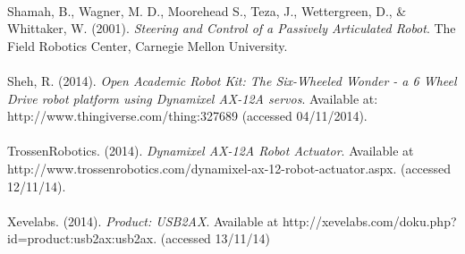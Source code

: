 \documentclass[]{article}
\begin{document}
\\
Shamah, B.,  Wagner, M. D., Moorehead S., Teza, J., Wettergreen, D., \& Whittaker, W. (2001). \textit{Steering and Control of a Passively Articulated Robot}. The Field Robotics Center, Carnegie Mellon University.\\
\\
Sheh, R. (2014). \textit{Open Academic Robot Kit: The Six-Wheeled Wonder - a 6 Wheel Drive robot platform using Dynamixel AX-12A servos}. Available at: http://www.thingiverse.com/thing:327689 (accessed 04/11/2014).\\
\\
TrossenRobotics. (2014). \textit{Dynamixel AX-12A Robot Actuator}. Available at http://www.trossenrobotics.com/dynamixel-ax-12-robot-actuator.aspx. (accessed 12/11/14).\\
\\
Xevelabs. (2014). \textit{Product: USB2AX}. Available at http://xevelabs.com/doku.php?id=product:usb2ax:usb2ax. (accessed 13/11/14)\\
\end{document}
